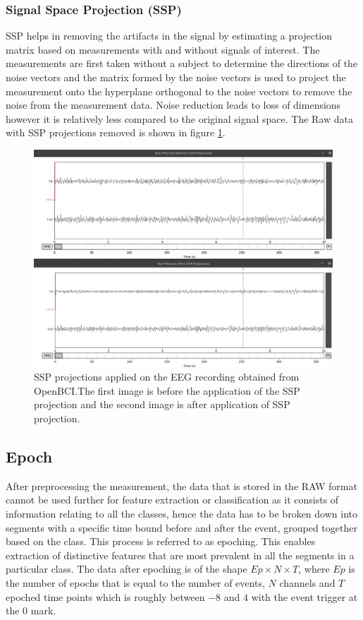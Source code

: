  
\subsubsection{Signal Space Projection (SSP)}
SSP  helps in removing the artifacts in the signal by estimating a projection matrix based on measurements with and without signals of interest. The measurements are first taken without a subject to determine the directions of the noise vectors and the matrix formed by the noise vectors is used to project the measurement onto the hyperplane orthogonal to the noise vectors to remove the noise from the measurement data. Noise reduction leads to loss of dimensions however it is relatively less compared to the original signal space. The Raw data with SSP projections removed is shown in figure \ref{fig:obci_ssp}.

\begin{figure}[H] 
    \begin{center}
    \includegraphics[height=0.6\textwidth]{images/obci_ssp.png}
    \caption{SSP projections applied on the EEG recording obtained from OpenBCI.The first image is before the application of the SSP projection and the second image is after application of SSP projection.}
    \label{fig:obci_ssp}
\end{center}
\end{figure}

\subsection{Epoch}
After preprocessing the measurement, the data that is stored in the RAW format cannot be used further for feature extraction or classification as it consists of information relating to all the classes, hence the data has to be broken down into segments with a specific time bound before and after the event, grouped together based on the class. This process is referred to as epoching. This enables extraction of distinctive features that are most prevalent in all the segments in a particular class. The data after epoching is of the shape $Ep \times N \times T$, where  $Ep$ is the number of epochs that is equal to the number of events, $N$ channels and $T$ epoched time points which is roughly between $-8$ and $4$ with the event trigger at the $0$ mark.


